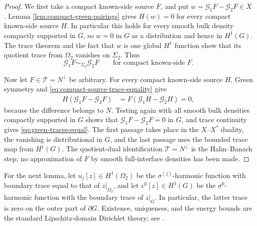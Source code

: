 \documentclass[11pt,oneside]{article}
\begin{document}
\begin{proof}
We first take a compact known-side source \(F\), and put
\(w=\mathcal G_1F-\mathcal G_2F\in X\).  Lemma
\ref{lem:compact-green-pairings} gives \(H(w)=0\) for every compact known-side
source \(H\).  In particular this holds for every smooth bulk density compactly
supported in \(G\), so \(w=0\) in \(G\) as a distribution and hence in
\(H^1(G)\).  The trace theorem and the fact that \(w\) is one global \(H^1\)
function show that its quotient trace from \(\Omega_2\) vanishes on
\(\Sigma_2\).  Thus
\begin{equation}
  \mathcal G_1F\sim_{\Sigma_2}\mathcal G_2F
  \qquad\text{for compact known-side }F.
  \label{eq:compact-source-trace-equality}
\end{equation}

Now let \(F\in\mathcal T=N^\perp\) be arbitrary.  For every compact known-side
source \(H\), Green symmetry and \eqref{eq:compact-source-trace-equality} give
\begin{align}
 H(\mathcal G_1F-\mathcal G_2F)
 &=F(\mathcal G_1H-\mathcal G_2H)=0,
\end{align}
because the difference belongs to \(N\).  Testing again with all smooth bulk
densities compactly supported in \(G\) shows that
\(\mathcal G_1F-\mathcal G_2F=0\) in \(G\), and trace continuity gives
\eqref{eq:green-traces-equal}.  The first passage takes place in the
\(X\)--\(X^*\) duality, the vanishing is distributional in \(G\), and the last
passage uses the bounded trace map from \(H^1(G)\).  The quotient-dual
identification \(\mathcal T=N^\perp\) is the Hahn--Banach step; no approximation
of \(F\) by smooth full-interface densities has been made.
\end{proof}

For the next lemma, let \(u_j[z]\in H^1(\Omega_2)\) be the
\(\sigma^{(j)}\)-harmonic function with boundary trace equal to that of
\(z|_{\Omega_2}\), and let \(v^0[z]\in H^1(G)\) be the
\(\sigma^0\)-harmonic function with the boundary trace of \(z|_G\).  In
particular, the latter trace is zero on the outer part of \(\partial G\).
Existence, uniqueness, and the energy bounds are the standard Lipschitz-domain
Dirichlet theory; see \cite[Chapters 3--4]{McLean2000}.
\end{document}
